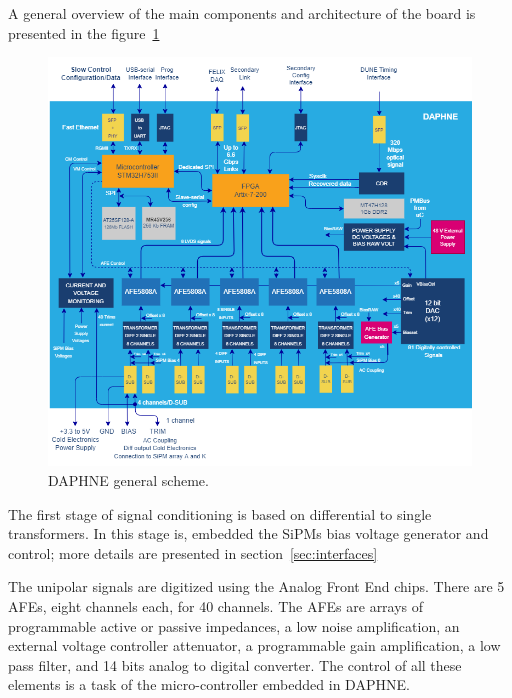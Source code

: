 A general overview of the main components and architecture of the board is presented in the figure~\ref{fig:DAPHNEBlocksScheme}

\begin{figure}[htbp]
\centering %
\includegraphics[width=1.\textwidth,origin=c,angle=0]{Images/Block_Diagram_DAPHNEV1_rev2.png}
\caption{\label{fig:DAPHNEBlocksScheme} DAPHNE general scheme.}
\end{figure}

The first stage of signal conditioning is based on differential to single transformers. In this stage is, embedded the SiPMs bias voltage generator and control; more details are presented in section~\ref{sec:interfaces}  

The unipolar signals are digitized using the Analog Front End chips. There are 5 AFEs, eight channels each, for 40 channels. The AFEs are arrays of programmable active or passive impedances, a low noise amplification, an external voltage controller attenuator, a programmable gain amplification, a low pass filter, and 14 bits analog to digital converter. The control of all these elements is a task of the micro-controller embedded in DAPHNE.


